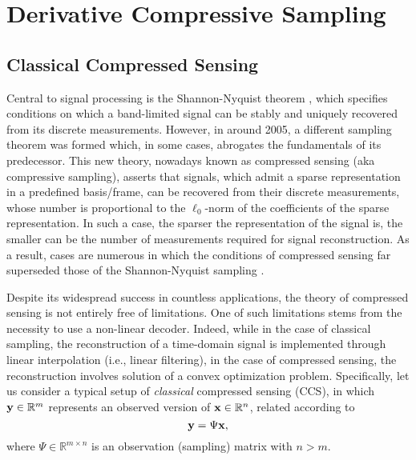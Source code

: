 \pdfoutput=1 \documentclass[journal]{IEEEtran}
\newcommand{\xx}{{\bf x}}
\newcommand{\yy}{{\bf y}}
\begin{document}
\section{Derivative Compressive Sampling}
\subsection{Classical Compressed Sensing}
Central to signal processing is the Shannon-Nyquist theorem \cite{45}, which specifies conditions on which a band-limited signal can be stably and uniquely recovered from its discrete measurements. However, in around 2005, a different sampling theorem was formed which, in some cases, abrogates the fundamentals of its predecessor. This new theory, nowadays known as compressed sensing (aka compressive sampling), asserts that signals, which admit a sparse representation in a predefined basis/frame, can be recovered from their discrete measurements, whose number is proportional to the $\ell_0$-norm of the coefficients of the sparse representation. In such a case, the sparser the representation of the signal is, the smaller can be the number of  measurements required for signal reconstruction. As a result, cases are numerous in which the conditions of compressed sensing far superseded those of the Shannon-Nyquist sampling \cite{4, 13}.

Despite its widespread success in countless applications, the theory of compressed sensing is not entirely free of limitations. One of such limitations stems from the necessity to use a non-linear decoder. Indeed, while in the case of classical sampling, the reconstruction of a time-domain signal is implemented through linear interpolation (i.e., linear filtering), in the case of compressed sensing, the reconstruction involves solution of a convex optimization problem. Specifically, let us consider a typical setup of {\em classical} compressed sensing (CCS), in which $\yy \in \mathbb{R}^m$ represents an observed version of $\xx \in \mathbb{R}^n$, related according to
\begin{equation} \label{13}
\yy = \Psi \xx,
\end{equation}
where $\Psi \in \mathbb{R}^{m\times n}$ is an observation (sampling) matrix with $n > m$.
\end{document}
